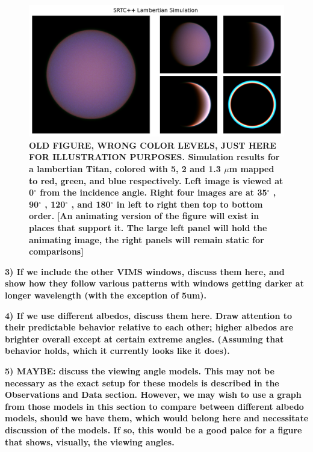 \documentclass[twocolumn,linenumbers]{aastex631}
\begin{document}
\begin{figure}[htbp]
\includegraphics[scale = 0.4]{LambertianSim.pdf}
\centering
\caption{\textbf{\color{blue}OLD FIGURE, WRONG COLOR LEVELS, JUST HERE FOR ILLUSTRATION PURPOSES. Simulation results for a lambertian Titan, colored with 5, 2 and 1.3 $\mu$m mapped to red, green, and blue respectively. Left image is viewed at 0$^{\circ}$  from the incidence angle. Right four images are at  35$^{\circ}$ ,  90$^{\circ}$ ,  120$^{\circ}$ , and  180$^{\circ}$  in left to right then top to bottom order.\color{black}} \textbf{\color{red}[An animating version of the figure will exist in places that support it. The large left panel will hold the animating image, the right panels will remain static for comparisons] \color{black}}}
\label{fig:9}
\end{figure}

\textbf{\color{blue}3) If we include the other VIMS windows, discuss them here, and show how they follow various patterns with windows getting darker at longer wavelength (with the exception of 5um). \color{black}}

 \textbf{\color{blue}4) If we use different albedos, discuss them here. Draw attention to their predictable behavior relative to each other; higher albedos are brighter overall except at certain extreme angles. (Assuming that behavior holds, which it currently looks like it does). \color{black}}

\textbf{\color{blue}5) MAYBE: discuss the viewing angle models. This may not be necessary as the exact setup for these models is described in the Observations and Data section. However, we may wish to use a graph from those models in this section to compare between different albedo models, should we have them, which would belong here and necessitate discussion of the models. If so, this would be a good palce for a figure that shows, visually, the viewing angles.\color{black}}
\end{document}
